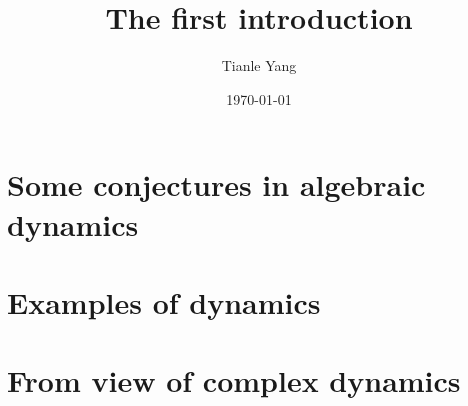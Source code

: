 \documentclass[sectionlevel=chapter,status=draft]{noteformyself}
\title{The first introduction}
\author{Tianle Yang}
\date{\today}
\begin{document}
    \maketitle

    \tableofcontents

    \section[
      status=draft,
      tag=00000,
      label=\labelNFM{sec:the-first-introduction:some-conjectures}
    ]{Some conjectures in algebraic dynamics}
    
    \section[
      status=draft,
      tag=00000,
      label=\labelNFM{sec:the-first-introduction:examples-of-dynamics}
    ]{Examples of dynamics}
    
    \section[
      status=draft,
      tag=00000,
      label=\labelNFM{sec:the-first-introduction:from-view-of-complex-dynamics}
    ]{From view of complex dynamics}
    

    \printbibliography[heading=bibintoc, title={References}]
\end{document}
